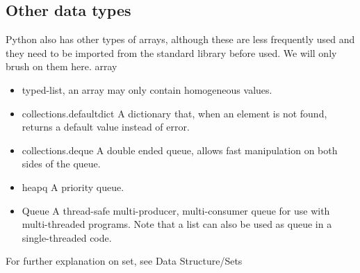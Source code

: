 \subsection{Other data types}
Python also has other types of arrays, although these are less frequently used
and they need to be imported from the standard library before used. We will only
brush on them here.  array
\begin{itemize}
	\item typed-list, an array may only contain homogeneous values.
	\item collections.defaultdict A dictionary that, when an element is not
found, returns a default value instead of error.
	\item collections.deque A double ended queue, allows fast manipulation on
both sides of the queue.
	\item heapq A priority queue.
\item Queue A thread-safe multi-producer, multi-consumer queue for use with
multi-threaded programs. Note that a list can also be used as queue in a
single-threaded code.
\end{itemize}

For further explanation on set, see Data Structure/Sets
